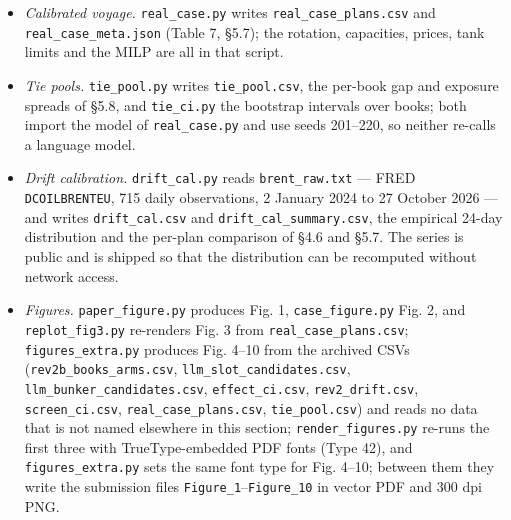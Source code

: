 \documentclass[preprint,12pt,letterpaper]{elsarticle}
\theoremstyle{definition}
\theoremstyle{plain}
\begin{document}
\begin{itemize}
\item \textit{Calibrated voyage.} \texttt{real\_\allowbreak{}case.\allowbreak{}py} writes \texttt{real\_\allowbreak{}case\_\allowbreak{}plans.\allowbreak{}csv} and \texttt{real\_\allowbreak{}case\_\allowbreak{}meta.\allowbreak{}json} (Table 7, \S 5.7); the rotation, capacities, prices, tank limits and the MILP are all in that script.
\item \textit{Tie pools.} \texttt{tie\_\allowbreak{}pool.\allowbreak{}py} writes \texttt{tie\_\allowbreak{}pool.\allowbreak{}csv}, the per-book gap and exposure spreads of \S 5.8, and \texttt{tie\_\allowbreak{}ci.\allowbreak{}py} the bootstrap intervals over books; both import the model of \texttt{real\_\allowbreak{}case.\allowbreak{}py} and use seeds 201--220, so neither re-calls a language model.
\item \textit{Drift calibration.} \texttt{drift\_\allowbreak{}cal.\allowbreak{}py} reads \texttt{brent\_\allowbreak{}raw.\allowbreak{}txt} --- FRED \texttt{DCOILBRENTEU}, 715 daily observations, 2 January 2024 to 27 October 2026 --- and writes \texttt{drift\_\allowbreak{}cal.\allowbreak{}csv} and \texttt{drift\_\allowbreak{}cal\_\allowbreak{}summary.\allowbreak{}csv}, the empirical 24-day distribution and the per-plan comparison of \S 4.6 and \S 5.7. The series is public and is shipped so that the distribution can be recomputed without network access.
\item \textit{Figures.} \texttt{paper\_\allowbreak{}figure.\allowbreak{}py} produces Fig. 1, \texttt{case\_\allowbreak{}figure.\allowbreak{}py} Fig. 2, and \texttt{replot\_\allowbreak{}fig3.\allowbreak{}py} re-renders Fig. 3 from \texttt{real\_\allowbreak{}case\_\allowbreak{}plans.\allowbreak{}csv}; \texttt{figures\_\allowbreak{}extra.\allowbreak{}py} produces Fig. 4--10 from the archived CSVs (\texttt{rev2b\_\allowbreak{}books\_\allowbreak{}arms.\allowbreak{}csv}, \texttt{llm\_\allowbreak{}slot\_\allowbreak{}candidates.\allowbreak{}csv}, \texttt{llm\_\allowbreak{}bunker\_\allowbreak{}candidates.\allowbreak{}csv}, \texttt{effect\_\allowbreak{}ci.\allowbreak{}csv}, \texttt{rev2\_\allowbreak{}drift.\allowbreak{}csv}, \texttt{screen\_\allowbreak{}ci.\allowbreak{}csv}, \texttt{real\_\allowbreak{}case\_\allowbreak{}plans.\allowbreak{}csv}, \texttt{tie\_\allowbreak{}pool.\allowbreak{}csv}) and reads no data that is not named elsewhere in this section; \texttt{render\_\allowbreak{}figures.\allowbreak{}py} re-runs the first three with TrueType-embedded PDF fonts (Type 42), and \texttt{figures\_\allowbreak{}extra.\allowbreak{}py} sets the same font type for Fig. 4--10; between them they write the submission files \texttt{Figure\_1}--\texttt{Figure\_10} in vector PDF and 300 dpi PNG.
\end{itemize}
\end{document}
